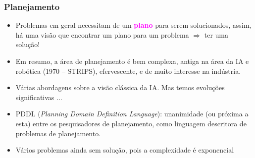 \begin{frame}[fragile]

    \frametitle{Planejamento}

   \begin{block}{}
     \begin{itemize}
 
       
      \item Problemas em geral necessitam de um \textcolor{magenta}{\textbf{plano}} 
      para serem solucionados, assim,
      há uma visão que encontrar um plano para um problema $\Rightarrow$ ter uma solução!

      \pause
      \item Em resumo, a área de planejamento é bem complexa, 
       antiga na área da IA e robótica (1970 -- STRIPS), 
       efervescente, e de muito interesse na indústria.
           
      \pause
      \item Várias abordagens sobre a visão clássica da IA. Mas temos evoluções
      significativas ...
      
      \pause
      \item PDDL (\textit{Planning Domain Definition Language}): unanimidade (ou próxima a esta)
      entre os pesquisadores de planejamento, como linguagem descritora
      de problemas de planejamento.

      \pause
      \item Vários problemas ainda sem solução, pois a complexidade é exponencial 
      
      
      

    \end{itemize}
    
    \end{block}
    
\end{frame}


